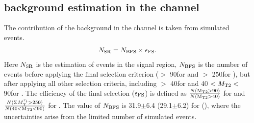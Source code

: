 \subsection{\texorpdfstring{\wjets background estimation in the \tauTau channel}{W+jets background estimation in the tau-tau channel}}
\label{sect:bkgW}
The contribution of the \wjets background in the \tauTau channel is taken from simulated events.
\begin{equation}
N_{\rm SR} = N_{\rm BFS} \times \epsilon_{\rm{FS}}.
\end{equation}
Here $N_{\rm SR}$ is the estimation of \wjets events in the signal region, $N_{\rm BFS}$ is the number of 
\wjets events before applying the final selection criterion (\mttwo $>$ 90\GeV for \binone and \SumMT $>$ 250\GeV for \bintwo), but after applying all other selection criteria, including \mttwo $>$ 40\GeV for \binone and 40 $<{M_{\rm T2}}<$ 90\GeV for \bintwo.
The efficiency of the final selection ($\epsilon_{\rm{FS}}$) is defined as $\frac{N (\rm M_{T2}>90)}{N (\rm M_{T2}>40)}$ for \binone and $\frac{N (\Sigma M_{\rm T}^{\tau_i}>250)}{N(40<\rm M_{T2}<90)}$ for \bintwo.
The value of $N_{\rm BFS}$ is 31.9$\pm$6.4 (29.1$\pm$6.2) for \binone (\bintwo), where the uncertainties arise from the limited number of simulated events. 


